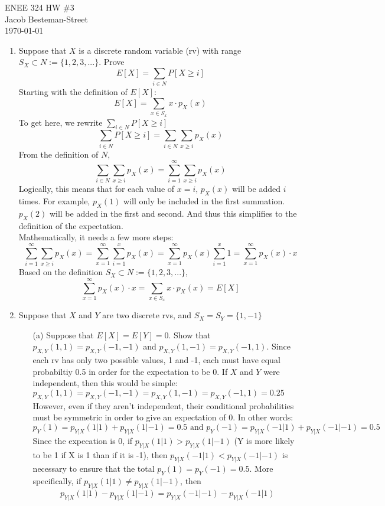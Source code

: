 \documentclass{report}
\begin{document}
ENEE 324 HW \#3 \\
Jacob Besteman-Street \\
\today \\
\begin{enumerate}
\item Suppose that $X$ is a discrete random variable (rv) with range $ S_X \subset N := \{1,2,3, ... \}$. Prove
$$ E[X] = \sum_{i \in N} P[X \geq i]$$
Starting with the definition of $E[X]$:
$$ E[X] = \sum_{x \in S_x} x \cdot p_X(x) $$
To get here, we rewrite $\sum_{i \in N} P[X \geq i]$
$$ \sum_{i \in N}P[X \geq i] = \sum_{i \in N} \sum_{x \geq i}p_X(x)   $$
From the definition of $N$,
$$\sum_{i \in N} \sum_{x \geq i}p_X(x) = \sum_{i = 1}^{\infty}\sum_{x \geq i}p_X(x)$$
Logically, this means that for each value of $x = i$, $p_X(x)$ will be added $i$ times. For example, $p_X(1)$ will only be included in the first summation. $p_X(2)$ will be added in the first and second. And thus this simplifies to the definition of the expectation. \\
Mathematically, it needs a few more steps:
$$\sum_{i = 1}^{\infty}\sum_{x \geq i}p_X(x) = \sum_{x = 1}^{\infty}\sum_{i =1}^{x}p_X(x) = \sum_{x = 1}^{\infty}p_X(x)\sum_{i =1}^{x}1 = \sum_{x = 1}^{\infty}p_X(x) \cdot x $$
Based on the definition $ S_X \subset N := \{1,2,3, ... \}$,
$$ \sum_{x = 1}^{\infty}p_X(x) \cdot x = \sum_{x \in S_x} x \cdot p_X(x) = E[X]$$
\item Suppose that $X$ and $Y$ are two discrete rvs, and $ S_X = S_Y = \{1,-1\}$
\begin{itemize}
\item[(a)] Suppose that $E[X] = E[Y] = 0$. Show that $p_{X,Y}(1,1) = p_{X,Y}(-1,-1)$ and $p_{X,Y}(1,-1) = p_{X,Y}(-1,1)$.
Since each rv has only two possible values, 1 and -1, each must have equal probabiltiy 0.5 in order for the expectation to be 0. If $X$ and $Y$ were independent, then this would be simple: $p_{X,Y}(1,1) = p_{X,Y}(-1,-1) = p_{X,Y}(1,-1) = p_{X,Y}(-1,1) = 0.25$ \\
However, even if they aren't independent, their conditional probabilities must be symmetric in order to give an expectation of 0. In other words:
$$p_Y(1) = p_{Y|X}(1|1)+p_{Y|X}(1|-1) = 0.5 \text{ and } p_Y(-1) = p_{Y|X}(-1|1)+p_{Y|X}(-1|-1) = 0.5$$
Since the expecation is 0, if $p_{Y|X}(1|1) > p_{Y|X}(1|-1)$ (Y is more likely to be 1 if X is 1 than if it is -1), then $p_{Y|X}(-1|1)<p_{Y|X}(-1|-1)$ is necessary to ensure that the total $p_Y(1) = p_Y(-1) = 0.5$. More specifically, if $p_{Y|X}(1|1) \neq p_{Y|X}(1|-1)$, then $$p_{Y|X}(1|1) - p_{Y|X}(1|-1) = p_{Y|X}(-1|-1)-p_{Y|X}(-1|1)$$

\end{itemize}
\end{enumerate}
\end{document}
